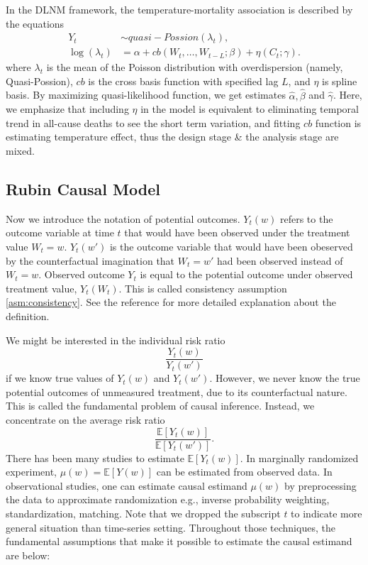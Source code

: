 \documentclass[12pt]{article}
\begin{document}
In the DLNM framework,
the temperature-mortality association is described by the equations
\[
	\begin{split}
		Y_t &\sim quasi-Possion(\lambda_t), \\
		\log(\lambda_t) &= \alpha + cb(W_t, \dots, W_{t-L};\beta) + \eta(C_t; \gamma).
	\end{split}
\]
where $\lambda_t$ is the mean of 
the Poisson distribution with overdispersion (namely, Quasi-Possion\cite{quasipoisson}),
$cb$ is the cross basis function with specified lag $L$,
and $\eta$ is spline basis.
By maximizing quasi-likelihood function, 
we get estimates $\hat{\alpha}, \hat{\beta}$ and $\hat{\gamma}$.
Here, we emphasize that 
including $\eta$ in the model is equivalent to eliminating temporal trend in all-cause deaths
to see the short term variation,
and fitting $cb$ function is estimating temperature effect,
thus the design stage \& the analysis stage are mixed.


\subsection{Rubin Causal Model}
\label{section:rcm}

Now we introduce the notation of potential outcomes.
$Y_t(w)$ refers to the outcome variable at time $t$
that would have been observed under the treatment value $W_t = w$.
$Y_t(w')$ is the outcome variable that would have been obeserved by the counterfactual imagination
that $W_t = w'$ had been observed instead of $W_t = w$.
Observed outcome $Y_t$ is equal to the potential outcome under observed treatment value, $Y_t(W_t)$.
This is called consistency assumption \ref{asm:consistency}.
See the reference\cite{whatif2020} for more detailed explanation about the definition.

We might be interested in the individual risk ratio
\[
	\frac{Y_t(w)}{Y_t(w')}
\]
if we know true values of $Y_t(w)$ and $Y_t(w')$.
However, we never know the true potential outcomes of unmeasured treatment, 
due to its counterfactual nature.
This is called the fundamental problem of causal inference\cite{holland1986}.
Instead, we concentrate on the average risk ratio
\[
	\frac{\mathbb{E}\left[ Y_t(w) \right]}{\mathbb{E}\left[ Y_t(w') \right]}.
\]
There has been many studies to estimate $\mathbb{E}[Y_t(w)]$.
In marginally randomized experiment, 
$\mu(w) = \mathbb{E}[Y(w)]$ can be estimated from observed data\cite{rubin1974}.
In observational studies, 
one can estimate causal estimand $\mu(w)$ by preprocessing the data to approximate randomization 
e.g., inverse probability weighting, standardization, matching\cite{rosenbaum1983}.
Note that we dropped the subscript $t$ to indicate more general situation than time-series setting.
Throughout those techniques, 
the fundamental assumptions that make it possible to estimate the causal estimand are below:
\end{document}
